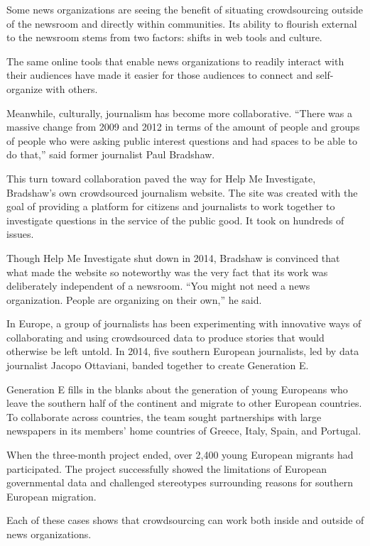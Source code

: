 \begin{itemize}
\begin{itemize}
Some news organizations are seeing the benefit of situating crowdsourcing outside of the newsroom and directly within communities. Its ability to flourish external to the newsroom stems from two factors: shifts in web tools and culture. 

The same online tools that enable news organizations to readily interact with their audiences have made it easier for those audiences to connect and self-organize with others.

Meanwhile, culturally, journalism has become more collaborative. ``There was a massive change from 2009 and 2012 in terms of the amount of people and groups of people who were asking public interest questions and had spaces to be able to do that,'' said former  journalist Paul Bradshaw.\autocite{Bradshaw}

This turn toward collaboration paved the way for Help Me Investigate, Bradshaw’s own crowdsourced journalism website.\autocite{HMI} The site was created with the goal of providing a platform for citizens and journalists to work together to investigate questions in the service of the public good. It took on hundreds of issues.

Though Help Me Investigate shut down in 2014, Bradshaw is convinced that what made the website so noteworthy was the very fact that its work was deliberately independent of a newsroom. ``You might not need a news organization. People are organizing on their own,'' he said. 

In Europe, a group of journalists has been experimenting with innovative ways of collaborating and using crowdsourced data to produce stories that would otherwise be left untold. In 2014, five southern European journalists, led by data journalist Jacopo Ottaviani, banded together to create Generation E. 

Generation E fills in the blanks about the generation of young Europeans who leave the southern half of the continent and migrate to other European countries. To collaborate across countries, the team sought partnerships with large newspapers in its members’ home countries of Greece, Italy, Spain, and Portugal.\autocite{Ottaviani}

When the three-month project ended, over 2,400 young European migrants had participated. The project successfully showed the limitations of European governmental data and challenged stereotypes surrounding reasons for southern European migration.\autocite{GE}

Each of these cases shows that crowdsourcing can work both inside and outside of news organizations. 


\end{itemize}
\end{itemize}

